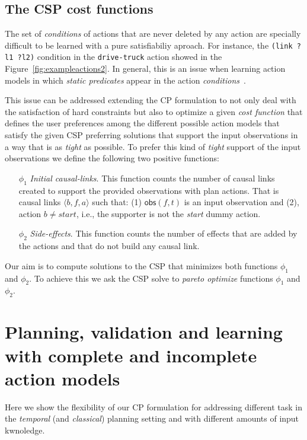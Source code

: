 \documentclass{ecai}
\newcommand{\tup}[1]{{\langle #1 \rangle}}
\newcommand{\obs}{\mathsf{obs}}    %
\begin{document}
\subsection{The CSP cost functions}
The set of {\em conditions} of actions that are never deleted by any action are specially difficult to be learned with a pure satisfiabiliy aproach. For instance, the {\tt (link ?l1 ?l2)} condition in the {\tt drive-truck} action showed in the Figure~\ref{fig:exampleactions2}. In general, this is an issue when learning action models in which {\em static predicates} appear in the action {\em conditions}~\cite{gregory2015domain}.

This issue can be addressed extending the CP formulation to not only deal with the satisfaction of hard constraints but also to optimize a given {\em cost function} that defines the user preferences among the different possible action models that satisfy the given CSP preferring solutions that support the input observations in a way that is as {\em tight} as possible. To prefer this kind of {\em tight} support of the input observations we define the following two positive functions:
\begin{enumerate}
\item[$\phi_1$] {\em Initial causal-links}. This function counts the number of causal links created to support the provided observations with plan actions. That is causal links $\tup{b,f,a}$ such that: (1) $\obs(f,t)$ is an input observation and (2), action $b\neq start$, i.e., the supporter is not the {\em start} dummy action.
\item[$\phi_2$] {\em Side-effects}. This function counts the number of effects that are added by the actions and that do not build any causal link.  
\end{enumerate}

Our aim is to compute solutions to the CSP that minimizes both functions $\phi_1$ and $\phi_2$. To achieve this we ask the CSP solve to {\em pareto optimize} functions $\phi_1$ and $\phi_2$. 
  


\section{Planning, validation and learning with complete and incomplete action models}
\label{sec:usingCPValidation}
Here we show the flexibility of our CP formulation for addressing different task in the {\em temporal} (and {\em classical}) planning setting and with different amounts of input kwnoledge.
\end{document}
